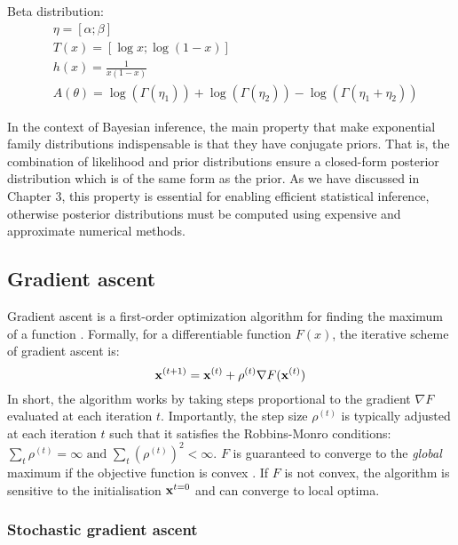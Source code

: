 Beta distribution:
\begin{align*}
	& \eta = [\alpha; \beta] \\
	& T(x) = [\log x; \log (1-x)] \\
	& h(x) = \frac{1}{x(1-x)} \\
	& A(\theta) = \log(\Gamma(\eta_1)) +\log(\Gamma(\eta_2)) - \log(\Gamma(\eta_1+\eta_2))
\end{align*}

In the context of Bayesian inference, the main property that make exponential family distributions indispensable is that they have conjugate priors. That is, the combination of likelihood and prior distributions ensure a closed-form posterior distribution which is of the same form as the prior. As we have discussed in Chapter 3, this property is essential for enabling efficient statistical inference, otherwise posterior distributions must be computed using expensive and approximate numerical methods.


\subsection{Gradient ascent} \label{section:gradient_ascent}

Gradient ascent is a first-order optimization algorithm for finding the maximum of a function \cite{Bishop2006,Murphy}. Formally, for a differentiable function $F(x)$, the iterative scheme of gradient ascent is:
\begin{equation} \label{gradient_ascent}
	{\bf x}^{(t+1)} = {\bf x}^{(t)} + \rho^{(t)} \nabla F({\bf x}^{(t)})
\end{equation}
In short, the algorithm works by taking steps proportional to the gradient $\nabla F$ evaluated at each iteration $t$. 
Importantly, the step size $\rho^{(t)}$ is typically adjusted at each iteration $t$ such that it satisfies the Robbins-Monro conditions: $\sum_t \rho^{(t)} = \infty \text{ and } \sum_t (\rho^{(t)})^2 < \infty$. $F$ is guaranteed to converge to the \textit{global} maximum if the objective function is convex \cite{Robbins-Monro1951}. If $F$ is not convex, the algorithm is sensitive to the initialisation ${\bf x}^{t=0}$ and can converge to local optima.


\subsubsection{Stochastic gradient ascent} \label{section:stochastic_gradient_ascent}

